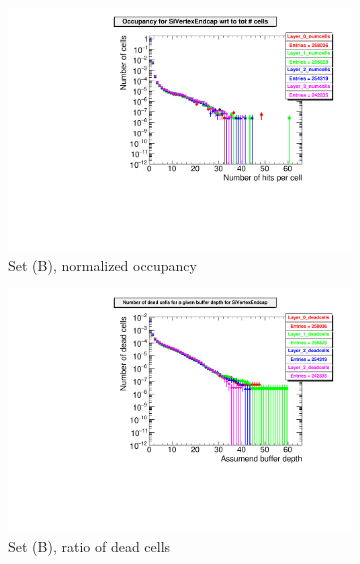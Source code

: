   \begin{figure}[htb]\ContinuedFloat
     \begin{subfigure}[b]{0.49\textwidth}
   \centering
    \includegraphics[width=\textwidth]{Figures/Pairs/occupancy_numcells_SiVertexEndcap_ILC250_SetB.pdf}
   \caption{Set (B), normalized occupancy}
   \end{subfigure}
   \hfill
    \begin{subfigure}[b]{0.49\textwidth}
   \centering
    \includegraphics[width=\textwidth]{Figures/Pairs/occupancy_deadcells_SiVertexEndcap_ILC250_SetB.pdf}
   \caption{Set (B), ratio of dead cells}
   \end{subfigure}\\
     \begin{subfigure}[b]{0.49\textwidth}
   \centering

\end{subfigure}
\end{figure}
